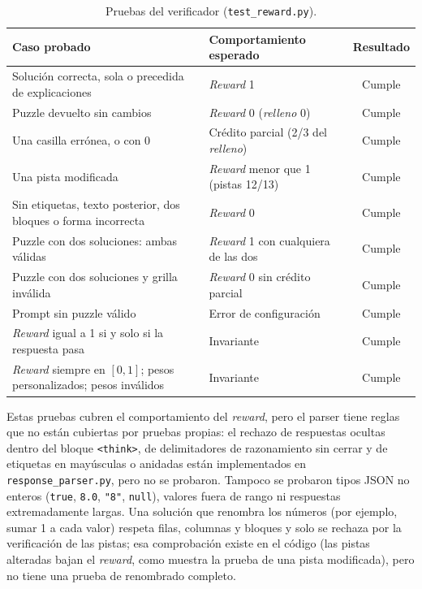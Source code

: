 \begin{table}[htbp]
  \centering\small
  \caption{Pruebas del verificador (\texttt{test\_reward.py}).}
  \label{tab:robustez}
  \begin{tabularx}{\linewidth}{@{}YYc@{}}
    \toprule
    Caso probado & Comportamiento esperado & Resultado \\
    \midrule
    Solución correcta, sola o precedida de explicaciones
      & \emph{Reward} 1 & Cumple \\
    Puzzle devuelto sin cambios
      & \emph{Reward} 0 (\emph{relleno} 0) & Cumple \\
    Una casilla errónea, o con 0
      & Crédito parcial (2/3 del \emph{relleno}) & Cumple \\
    Una pista modificada
      & \emph{Reward} menor que 1 (pistas 12/13) & Cumple \\
    Sin etiquetas, texto posterior, dos bloques o forma incorrecta
      & \emph{Reward} 0 & Cumple \\
    Puzzle con dos soluciones: ambas válidas
      & \emph{Reward} 1 con cualquiera de las dos & Cumple \\
    Puzzle con dos soluciones y grilla inválida
      & \emph{Reward} 0 sin crédito parcial & Cumple \\
    Prompt sin puzzle válido
      & Error de configuración & Cumple \\
    \emph{Reward} igual a 1 si y solo si la respuesta pasa
      & Invariante & Cumple \\
    \emph{Reward} siempre en $[0, 1]$; pesos personalizados; pesos inválidos
      & Invariante & Cumple \\
    \bottomrule
  \end{tabularx}
\end{table}

Estas pruebas cubren el comportamiento del \emph{reward}, pero el parser tiene
reglas que no están cubiertas por pruebas propias: el rechazo de respuestas
ocultas dentro del bloque \texttt{<think>}, de delimitadores de razonamiento sin
cerrar y de etiquetas en mayúsculas o anidadas están implementados en
\texttt{response\_parser.py}, pero no se probaron. Tampoco se probaron tipos
JSON no enteros (\texttt{true}, \texttt{8.0}, \texttt{"8"}, \texttt{null}), valores
fuera de rango ni respuestas extremadamente largas. Una solución que renombra
los números (por ejemplo, sumar 1 a cada valor) respeta filas, columnas y
bloques y solo se rechaza por la verificación de las pistas; esa comprobación
existe en el código (las pistas alteradas bajan el \emph{reward}, como muestra la
prueba de una pista modificada), pero no tiene una prueba de renombrado completo.

